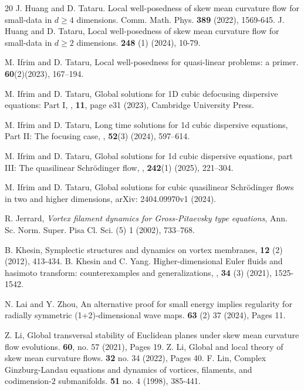 \documentclass[11pt,letterpaper,reqno]{amsart}
\numberwithin{equation}{section}
\theoremstyle{definition}
\theoremstyle{remark}
\begin{document}
\begin{thebibliography}{20}
	J. Huang  and D. Tataru. Local well-posedness of skew mean curvature flow for small-data in
	$d\ge 4$ dimensions. Comm. Math. Phys. \textbf{389} (2022), 1569-645. 
J. Huang and D. Tataru, Local well-posedness of skew mean curvature flow for small-data
	in $d\ge 2$ dimensions.   \textbf{248} (1) (2024), 10-79. 
	
	
	
	
 M. Ifrim and D. Tataru, Local well-posedness for quasi-linear problems: a
primer.  \textbf{60}(2)(2023), 167–194. 

		M. Ifrim and D. Tataru, Global solutions for 1D cubic defocusing dispersive equations: Part
			I,
		, \textbf{11}, page e31 (2023), Cambridge
		University Press.
		
		
	M. Ifrim  and D. Tataru, Long time solutions for 1d cubic dispersive equations, Part II: The
			focusing case,
		, \textbf{52}(3) (2024), 597--614.

		
	M. Ifrim  and D. Tataru,
		 Global solutions for 1d cubic dispersive equations, part III: The
			quasilinear Schr{\"o}dinger flow,
		, \textbf{242}(1) (2025), 221--304.
	
M. Ifrim  and D. Tataru, Global solutions for cubic quasilinear Schr\"odinger flows in two and higher dimensions, arXiv: 2404.09970v1 (2024).

 R. Jerrard,
\emph{Vortex filament dynamics for Gross-Pitaevsky type equations},
Ann. Sc. Norm. Super. Pisa Cl. Sci. (5) 1 (2002), 733--768.
	
	B. Khesin, Symplectic structures and dynamics on vortex membranes,  \textbf{12} (2) (2012), 413-434.
	B. Khesin and C. Yang. Higher-dimensional Euler fluids
	and hasimoto transform: counterexamples and generalizations, ,  \textbf{34} (3) (2021), 1525-1542.
	
	
	N. Lai and Y. Zhou, An alternative proof for small energy implies regularity for radially symmetric (1+2)-dimensional wave maps.  \textbf{63} (2) 37 (2024), Pages 11.  
	
	
	
	Z. Li,  Global transversal stability of Euclidean planes under skew mean curvature flow
	evolutions.  \textbf{60}, no. 57 (2021), Pages 19.
	Z. Li, Global and local theory of skew mean curvature flows.  \textbf{32} no. 34 (2022), Pages 40.
	F. Lin, Complex Ginzburg-Landau equations and dynamics of vortices, filaments, and codimension-$2$ submanifolds.  \textbf{51} no. 4 (1998), 385-441.
	

\end{thebibliography}
\end{document}
